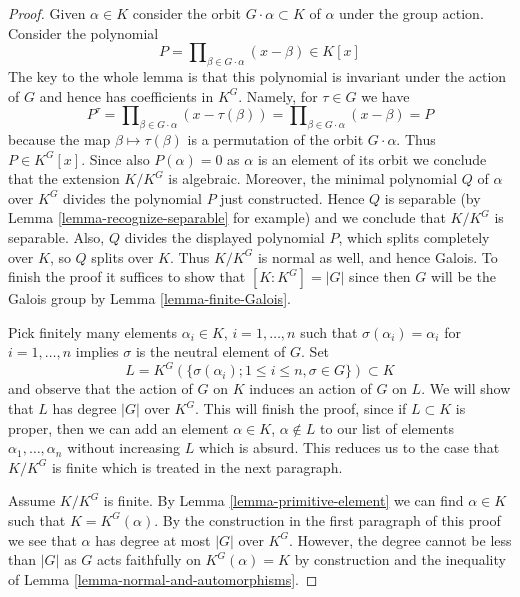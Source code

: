 \begin{proof}
Given $\alpha \in K$ consider the orbit $G \cdot \alpha \subset K$
of $\alpha$ under the group action. Consider the polynomial
$$
P = \prod\nolimits_{\beta \in G \cdot \alpha} (x - \beta) \in K[x]
$$
The key to the whole lemma is that this polynomial is invariant
under the action of $G$ and hence has coefficients in $K^G$.
Namely, for $\tau \in G$ we have
$$
P^\tau = \prod\nolimits_{\beta \in G \cdot \alpha} (x - \tau(\beta)) =
\prod\nolimits_{\beta \in G \cdot \alpha} (x - \beta) = P
$$
because the map $\beta \mapsto \tau(\beta)$ is a permutation of
the orbit $G \cdot \alpha$. Thus $P \in K^G[x]$. Since also
$P(\alpha) = 0$ as $\alpha$ is an element of its orbit
we conclude that the extension $K/K^G$ is algebraic. Moreover,
the minimal polynomial $Q$ of $\alpha$ over $K^G$ divides the
polynomial $P$ just constructed. Hence $Q$ is separable
(by Lemma \ref{lemma-recognize-separable} for example) and
we conclude that $K/K^G$ is separable. Also, $Q$ divides the displayed
polynomial $P$, which splits completely over $K$, so $Q$ splits over $K$.
Thus $K/K^G$ is normal as well, and hence Galois.
To finish the proof it suffices to show that $[K : K^G] = |G|$
since then $G$ will be the Galois group by
Lemma \ref{lemma-finite-Galois}.

\medskip\noindent
Pick finitely many elements $\alpha_i \in K$, $i = 1, \ldots, n$
such that $\sigma(\alpha_i) = \alpha_i$ for $i = 1, \ldots, n$ implies
$\sigma$ is the neutral element of $G$. Set
$$
L = K^G(\{\sigma(\alpha_i); 1 \leq i \leq n, \sigma \in G\}) \subset K
$$
and observe that the action of $G$ on $K$ induces an action of $G$ on $L$.
We will show that $L$ has degree $|G|$ over $K^G$. This will finish the
proof, since if $L \subset K$ is proper, then we can add an element
$\alpha \in K$, $\alpha \not \in L$ to our list of elements
$\alpha_1, \ldots, \alpha_n$ without increasing $L$ which is absurd.
This reduces us to the case that $K/K^G$ is finite which is
treated in the next paragraph.

\medskip\noindent
Assume $K/K^G$ is finite. By Lemma \ref{lemma-primitive-element}
we can find $\alpha \in K$ such that $K = K^G(\alpha)$.
By the construction in the first paragraph of this proof we see
that $\alpha$ has degree at most $|G|$ over $K^G$. However, the
degree cannot be less than $|G|$ as $G$ acts faithfully on
$K^G(\alpha) = K$ by construction and the inequality of
Lemma \ref{lemma-normal-and-automorphisms}.
\end{proof}

